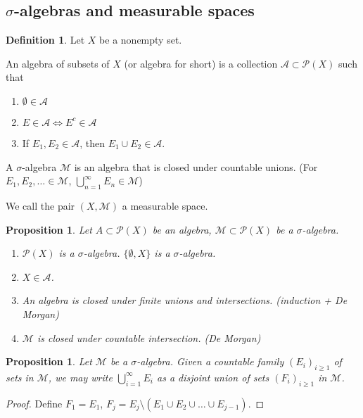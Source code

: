 \documentclass[11pt]{amsart}
\newtheorem{proposition}[theorem]{Proposition}
\theoremstyle{definition}
\newtheorem{definition}[theorem]{Definition}
\numberwithin{equation}{section}
\begin{document}
\subsection{\texorpdfstring{$\sigma$}{sigma}-algebras and measurable spaces}
\begin{definition}
    Let $X$ be a nonempty set. 

    An algebra of subsets of $X$ (or algebra for short) is a collection $\mathcal A\subset \mathcal P(X)$ such that
    \begin{enumerate}
        \item [(i)] $\emptyset\in\mathcal A$
        \item [(ii)] $E\in \mathcal A\iff E^c\in\mathcal A$
        \item [(iii)] If $E_1,E_2\in\mathcal A$, then $E_1\cup E_2\in\mathcal A$.
    \end{enumerate}
    A $\sigma$-algebra $\mathcal M$ is an algebra that is closed under countable unions. (For $E_1,E_2,\ldots\in\mathcal M$, $\bigcup_{n=1}^\infty E_n\in\mathcal M$)

    We call the pair $(X,\mathcal M)$ a measurable space.
\end{definition}
\begin{proposition}
    Let $A\subset\mathcal P(X)$ be an algebra, $\mathcal M\subset\mathcal P(X)$ be a $\sigma$-algebra.
    \begin{enumerate}
        \item [(0)] $\mathcal P(X)$ is a $\sigma$-algebra. $\{\emptyset,X\}$ is a $\sigma$-algebra.
        \item [(1)] $X\in\mathcal A$.
        \item [(2)] An algebra is closed under finite unions and intersections. (induction + De Morgan)
        \item [(3)] $\mathcal M$ is closed under countable intersection. (De Morgan)
    \end{enumerate}
\end{proposition}
\begin{proposition}\label{discretization}
    Let $\mathcal M$ be a $\sigma$-algebra. Given a countable family $(E_i)_{i\ge 1}$ of sets in $\mathcal M$, we may write $\bigcup_{i=1}^\infty E_i$ as a disjoint union of sets $(F_i)_{i\ge 1}$ in $\mathcal M$.
\end{proposition}
\begin{proof}
    Define $F_1=E_1$, $F_j=E_j\setminus \left(E_1\cup E_2\cup\ldots\cup E_{j-1}\right)$.
\end{proof}
\end{document}
